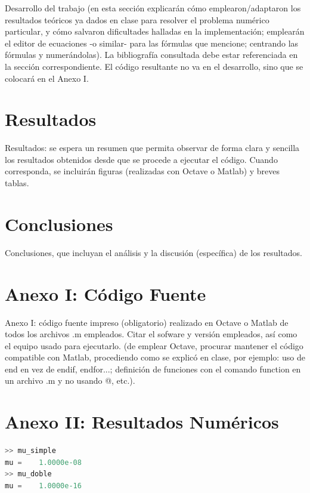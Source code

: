 \documentclass[11pt,a4paper]{article}
\begin{document}
 Desarrollo del trabajo (en esta sección explicarán cómo emplearon/adaptaron los
resultados teóricos ya dados en clase para resolver el problema numérico particular, y cómo
salvaron dificultades halladas en la implementación; emplearán el editor de ecuaciones -o
similar- para las fórmulas que mencione; centrando las fórmulas y numerándolas). La
bibliografía consultada debe estar referenciada en la sección correspondiente. El código
resultante no va en el desarrollo, sino que se colocará en el Anexo I.

\section{Resultados}
 Resultados: se espera un resumen que permita observar de forma clara y sencilla los
resultados obtenidos desde que se procede a ejecutar el código. Cuando corresponda, se
incluirán figuras (realizadas con Octave o Matlab) y breves tablas.

\section{Conclusiones}
 Conclusiones, que incluyan el análisis y la discusión (específica) de los resultados.

\newpage
\appendix
\section{Anexo I: Código Fuente}




Anexo I: código fuente impreso (obligatorio) realizado en Octave o Matlab de todos los
archivos .m empleados. Citar el sofware y versión empleados, así como el equipo usado para
ejecutarlo. (de emplear Octave, procurar mantener el código compatible con Matlab,
procediendo como se explicó en clase, por ejemplo: uso de end en vez de endif, endfor...;
definición de funciones con el comando function en un archivo .m y no usando @, etc.).

\section{Anexo II: Resultados Numéricos}
\begin{lstlisting}[language=Octave]
>> mu_simple
mu =    1.0000e-08
>> mu_doble
mu =    1.0000e-16
\end{lstlisting}
\end{document}
